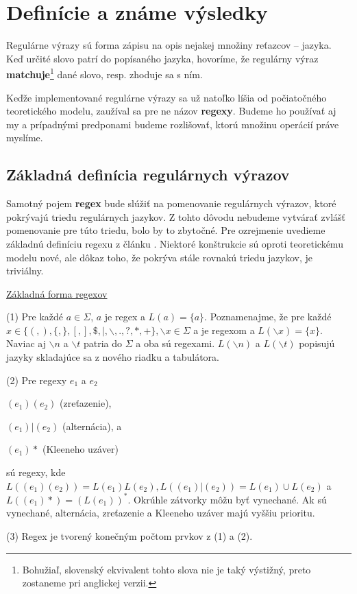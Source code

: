 \chapter{Definície a známe výsledky}
\label{chap:kapitola1}

Regulárne výrazy sú forma zápisu na opis nejakej množiny reťazcov -- jazyka. Keď určité slovo patrí do popísaného jazyka, hovoríme, že regulárny výraz \textbf{matchuje}\footnote{Bohužiaľ, slovenský ekvivalent tohto slova nie je taký výstižný, preto zostaneme pri anglickej verzii.} dané slovo, resp. zhoduje sa s ním.

Keďže implementované regulárne výrazy sa už natoľko líšia od počiatočného teoretického modelu, zaužíval sa pre ne názov \textbf{regexy}. Budeme ho používať aj my a prípadnými predponami budeme rozlišovať, ktorú množinu operácií práve myslíme.

\section{Základná definícia regulárnych výrazov}
\label{def}

Samotný pojem \textbf{regex} bude slúžiť na pomenovanie regulárnych výrazov, ktoré pokrývajú triedu regulárnych jazykov. Z tohto dôvodu nebudeme vytvárať zvlášť pomenovanie pre túto triedu, bolo by to zbytočné. Pre ozrejmenie uvedieme základnú definíciu regexu z článku \cite{ExtendedRegexPower}. Niektoré konštrukcie sú oproti teoretickému modelu nové, ale dôkaz toho, že pokrýva stále rovnakú triedu jazykov, je triviálny.

\underline{Základná forma regexov}
\begin{list}{}{}
\item[(1)] Pre každé $a \in \Sigma$, $a$ je regex a $L(a)=\lbrace a \rbrace$. Poznamenajme, že pre každé $x \in \lbrace (,), \{, \},[,],\mathdollar,|, \backslash, .,?,*,+ \rbrace, \backslash x \in \Sigma $ a je regexom a $L(\backslash x) = \lbrace x \rbrace$. Naviac aj $\backslash n$ a $\backslash t$ patria do $\Sigma$ a oba sú regexami. $L(\backslash n)$ a $L(\backslash t)$ popisujú jazyky skladajúce sa z nového riadku a tabulátora.
\item[(2)] Pre regexy $e_1$ a $e_2$ 
\begin{list}{}{}
\item $(e_1)(e_2)$ (zreťazenie), 
\item $(e_1)|(e_2)$ (alternácia), a 
\item $(e_1)*$ (Kleeneho uzáver) 
\end{list}
sú regexy, kde $L((e_1)(e_2)) = L(e_1)L(e_2), L((e_1)|(e_2))=L(e_1) \cup L(e_2)$ a $L((e_1)*) = (L(e_1))^*$. Okrúhle zátvorky môžu byť vynechané. Ak sú vynechané, alternácia, zreťazenie a Kleeneho uzáver majú vyššiu prioritu.
\item[(3)] Regex je tvorený konečným počtom prvkov z (1) a (2).
\end{list}

